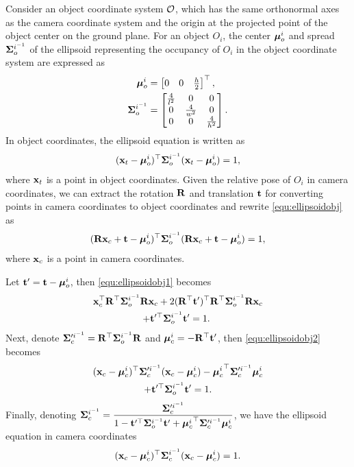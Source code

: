 \documentclass[10pt,twocolumn,letterpaper]{article}
\begin{document}
Consider an object coordinate system ${\mathcal{O}}$, which has the same orthonormal axes as the camera coordinate system and the origin at the projected point of the object center on the ground plane. For an object $O_i$, the center ${\bm{\mu}}^{i}_o$ and spread $\bm{\Sigma}^{i^{-1}}_o$ of the ellipsoid representing the occupancy of $O_i$ in the object coordinate system are expressed as
\begin{align}
  {\bm{\mu}}^{i}_o &= \begin{bmatrix}
  0& 0& \frac{h}{2}
  \end{bmatrix}^\top,\\
  \bm{\Sigma}^{i^{-1}}_o &= \begin{bmatrix}
    \frac{4}{l^2} & 0 & 0 \\
    0 & \frac{4}{w^2} & 0 \\
    0 & 0 & \frac{4}{h^2}
  \end{bmatrix}.
\end{align}
In object coordinates, the ellipsoid equation is written as
\begin{align}
  (\mathbf{x}_t - {\bm{\mu}}^{i}_o)^\top \bm{\Sigma}^{i^{-1}}_o (\mathbf{x}_t - {\bm{\mu}}^{i}_o) = 1,
\label{equ:ellipsoidobj}
\end{align}
where $\mathbf{x}_t$ is a point in object coordinates. Given the relative pose of $O_i$ in camera coordinates, we can extract the rotation $\mathbf{R}$ and translation $\mathbf{t}$ for converting points in camera coordinates to object coordinates and rewrite \eqref{equ:ellipsoidobj} as
\begin{align}
  (\mathbf{R} \mathbf{x}_c + \mathbf{t} - {\bm{\mu}}^{i}_o)^\top \bm{\Sigma}^{i^{-1}}_o (\mathbf{R} \mathbf{x}_c + \mathbf{t} - {\bm{\mu}}^{i}_o) = 1,
\label{equ:ellipsoidobj1}
\end{align}
where $\mathbf{x}_c$ is a point in camera coordinates.

Let $\mathbf{t}' = \mathbf{t} - {\bm{\mu}}^{i}_o$, then \eqref{equ:ellipsoidobj1} becomes
\begin{multline}
  \mathbf{x}_c^\top \mathbf{R}^\top \bm{\Sigma}^{i^{-1}}_o \mathbf{R} \mathbf{x}_c + 2 (\mathbf{R}^\top \mathbf{t}')^\top  \mathbf{R}^\top\bm{\Sigma}^{i^{-1}}_o \mathbf{R} \mathbf{x}_c
  \\
  + \mathbf{t}'^\top \bm{\Sigma}^{i^{-1}}_o \mathbf{t}' = 1.
\
\label{equ:ellipsoidobj2}
\end{multline}
Next, denote $\bm{\Sigma}'^{i^{-1}}_c = \mathbf{R}^\top \bm{\Sigma}^{i^{-1}}_o \mathbf{R}$ and ${{\bm{\mu}}^{i}_c} = - \mathbf{R}^\top
\mathbf{t}'$, then \eqref{equ:ellipsoidobj2} becomes
\begin{multline}
  (\mathbf{x}_c - {{\bm{\mu}}^{i}_c})^\top\bm{\Sigma}'^{i^{-1}}_c(\mathbf{x}_c - {{\bm{\mu}}^{i}_c}) - {{\bm{\mu}}^{i}_c}^\top\bm{\Sigma}'^{i^{-1}}_c{{\bm{\mu}}^{i}_c} 
  \\
  + \mathbf{t}'^\top \bm{\Sigma}^{i^{-1}}_o \mathbf{t}' = 1.
\end{multline}
Finally, denoting $\bm{\Sigma}^{i^{-1}}_c = \displaystyle\frac{\bm{\Sigma}'^{i^{-1}}_c}{1 - \mathbf{t}'^\top \bm{\Sigma}^{i^{-1}}_o \mathbf{t}' +
{{\bm{\mu}}^{i}_c}^\top\bm{\Sigma}'^{i^{-1}}_c{{\bm{\mu}}^{i}_c}}$, we have the ellipsoid equation in camera coordinates
\begin{align}
(\mathbf{x}_c - {{\bm{\mu}}^{i}_c})^\top\bm{\Sigma}^{i^{-1}}_c(\mathbf{x}_c - {{\bm{\mu}}^{i}_c}) = 1.
\label{equ:ellipsoidcam}
\end{align}
\end{document}
